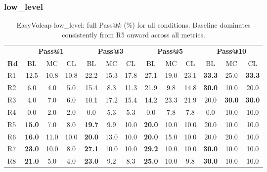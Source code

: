 \documentclass[11pt]{article}
\begin{document}
\subsubsection{low\_level}

\begin{table}[t]
  \centering
  \small
  \begin{tabular}{l|ccc|ccc|ccc|ccc}
    \toprule
    & \multicolumn{3}{c|}{\textbf{Pass@1}} & \multicolumn{3}{c|}{\textbf{Pass@3}} & \multicolumn{3}{c|}{\textbf{Pass@5}} & \multicolumn{3}{c}{\textbf{Pass@10}} \\
    \textbf{Rd} & BL & MC & CL & BL & MC & CL & BL & MC & CL & BL & MC & CL \\
    \midrule
    R1 & 12.5 & 10.8 & 10.8  & 22.2 & 15.3 & 17.8  & 27.1 & 19.0 & 23.1  & \textbf{33.3} & 25.0 & \textbf{33.3} \\
    R2 & 6.0 & 4.0 & 5.0    & 15.4 & 8.3 & 11.3   & 21.9 & 9.8 & 14.8   & \textbf{30.0} & 10.0 & 20.0 \\
    R3 & 4.0 & 7.0 & 6.0    & 10.1 & 17.2 & 15.4   & 14.2 & 23.3 & 21.9  & 20.0 & \textbf{30.0} & \textbf{30.0} \\
    R4 & 0.0 & 2.0 & 2.0    & 0.0 & 5.3 & 5.3     & 0.0 & 7.8 & 7.8    & 0.0 & 10.0 & 10.0 \\
    R5 & \textbf{15.0} & 7.0 & 8.0  & \textbf{19.7} & 9.9 & 10.0  & \textbf{20.0} & 10.0 & 10.0 & 20.0 & 10.0 & 10.0 \\
    R6 & \textbf{16.0} & 11.0 & 10.0 & \textbf{20.0} & 13.0 & 10.0 & \textbf{20.0} & 15.0 & 10.0 & 20.0 & 20.0 & 10.0 \\
    R7 & \textbf{23.0} & 10.0 & 8.0  & \textbf{27.1} & 10.0 & 10.0 & \textbf{29.2} & 10.0 & 10.0 & \textbf{30.0} & 10.0 & 10.0 \\
    R8 & \textbf{21.0} & 5.0 & 4.0  & \textbf{23.0} & 9.2 & 8.3  & \textbf{25.0} & 10.0 & 9.8  & \textbf{30.0} & 10.0 & 10.0 \\
    \bottomrule
  \end{tabular}
  \caption{EasyVolcap low\_level: full Pass@$k$ (\%) for all conditions. Baseline dominates consistently from R5 onward across all metrics.}
  \label{tab:app-ev-low}
\end{table}
\end{document}
